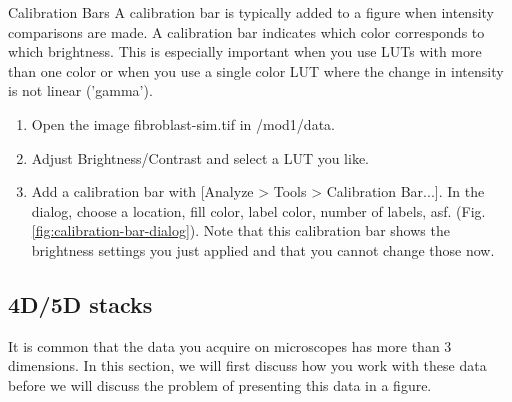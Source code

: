 \begin{taskbox}{Calibration Bars}
A calibration bar is typically added to a figure when intensity comparisons are made. A calibration bar indicates which color corresponds to which brightness. This is especially important when you use LUTs with more than one color or when you use a single color LUT where the change in intensity is not linear ('gamma').

\begin{enumerate}
	\item Open the image fibroblast-sim.tif in /mod1/data. 
	\item Adjust Brightness/Contrast and select a LUT you like.
	\item Add a calibration bar with [Analyze > Tools > Calibration Bar...]. In the dialog, choose a location, fill color, label color, number of labels, asf. (Fig. \ref{fig:calibration-bar-dialog}). Note that this calibration bar shows the brightness settings you just applied and that you cannot change those now.	
	
	\begin{minipage}[t]{\linewidth}
		\begin{center}
		\medskip
		\label{fig:calibration-bar-dialog}
		\end{center}
	\end{minipage}
	
\end{enumerate}

\end{taskbox}

\newpage
\subsection{4D/5D stacks}
It is common that the data you acquire on microscopes has more than 3 dimensions. In this section, we will first discuss how you work with these data before we will discuss the problem of presenting this data in a figure.

